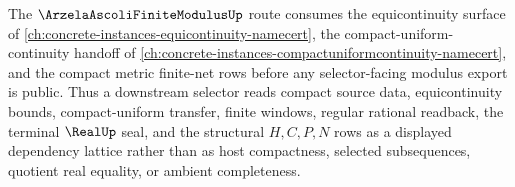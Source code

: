 The $\ArzelaAscoliFiniteModulusUp$ route consumes the equicontinuity surface of \autoref{ch:concrete-instances-equicontinuity-namecert}, the compact-uniform-continuity handoff of \autoref{ch:concrete-instances-compactuniformcontinuity-namecert}, and the compact metric finite-net rows before any selector-facing modulus export is public. Thus a downstream selector reads compact source data, equicontinuity bounds, compact-uniform transfer, finite windows, regular rational readback, the terminal $\RealUp$ seal, and the structural $H,C,P,N$ rows as a displayed dependency lattice rather than as host compactness, selected subsequences, quotient real equality, or ambient completeness.
